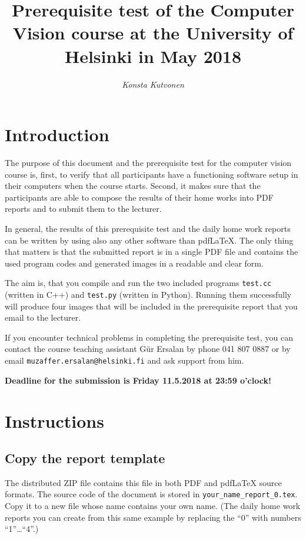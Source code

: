 \documentclass{article}
\begin{document}
\title{Prerequisite test of the Computer Vision course at the
  University of Helsinki in May 2018}

\author{\emph{Konsta Kutvonen}}
\maketitle

\newpage

\section{Introduction}

The purpose of this document and the prerequisite test for the
computer vision course is, first, to verify that all participants have
a functioning software setup in their computers when the course
starts.  Second, it makes sure that the participants are able to
compose the results of their home works into PDF reports and to submit
them to the lecturer.

In general, the results of this prerequisite test and the daily home
work reports can be written by using also any other software than
pdf\LaTeX{}.  The only thing that matters is that the submitted report
is in a single PDF file and contains the used program codes and
generated images in a readable and clear form.

The aim is, that you compile and run the two included programs
\texttt{test.cc} (written in C++) and \texttt{test.py} (written in
Python).  Running them successfully will produce four images that will
be included in the prerequisite report that you email to the lecturer.

If you encounter technical problems in completing the prerequisite
test, you can contact the course teaching assistant Gür Ersalan by
phone 041 807 0887 or by email \texttt{muzaffer.ersalan@helsinki.fi}
and ask support from him.

\textbf{Deadline for the submission is Friday 11.5.2018 at 23:59 o'clock!}

\section{Instructions}
\label{sec:running}

\subsection{Copy the report template}

The distributed ZIP file contains this file in both PDF and
pdf\LaTeX{} source formats.  The source code of the document is stored
in \texttt{your\_name\_report\_0.tex}.  Copy it to a new file whose
name contains your own name.  (The daily home work reports you can
create from this same example by replacing the ``0'' with numbers
``1''\ldots``4''.)
\end{document}
